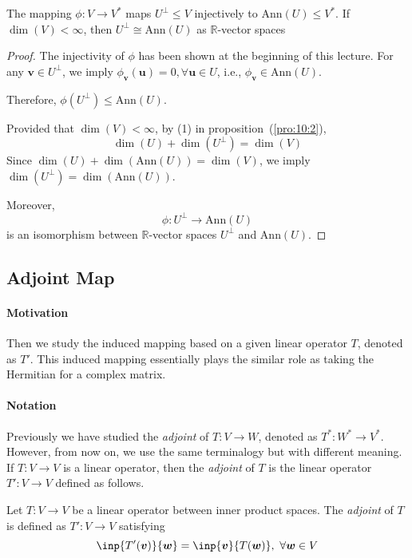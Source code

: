 \begin{proposition}
The mapping $\phi:V\to V^*$ maps $U^\perp\le V$ injectively to $\text{Ann}(U)\le V^*$.
If $\dim(V)<\infty$, then $U^\perp\cong\text{Ann}(U)$ as $\mathbb{R}$-vector spaces
\end{proposition}
\begin{proof}
The injectivity of $\phi$ has been shown at the beginning of this lecture.
For any $\bm v\in U^\perp$, we imply $\phi_{\bm v}(\bm u)=0,\forall\bm u\in U$, i.e., $\phi_{\bm v}\in\text{Ann}(U)$.

Therefore, $\phi(U^\perp)\le\text{Ann}(U)$. 

Provided that $\dim(V)<\infty$, by (1) in proposition~(\ref{pro:10:2}), 
\[
\dim(U)+\dim(U^\perp)=\dim(V)
\]
Since $\dim(U)+\dim(\text{Ann}(U))=\dim(V)$, we imply $\dim(U^\perp) = \dim(\text{Ann}(U))$.

Moreover, 
\[
\phi:U^\perp\to\text{Ann}(U)
\]
is an isomorphism between $\mathbb{R}$-vector spaces $U^\perp$ and $\text{Ann}(U)$.
\end{proof}

\subsection{Adjoint Map}
\paragraph{Motivation}
Then we study the induced mapping based on a given linear operator $T$, denoted as $T'$.
This induced mapping essentially plays the similar role as taking the Hermitian for a complex matrix.
\paragraph{Notation}
Previously we have studied the \emph{adjoint} of $T:V\to W$, denoted as $T^*:W^*\to V^*$.
However, from now on, we use the same terminalogy but with different meaning.
If $T:V\to V$ is a linear operator, then the \emph{adjoint} of $T$ is the linear operator $T':V\to V$ defined as follows.

\begin{definition}[Adjoint]
Let $T:V\to V$ be a linear operator between inner product spaces.
The \emph{adjoint} of $T$ is defined as 
$T':V\to V$ satisfying
\begin{equation}\label{Eq:10:1}
\inp{T'(\bm v)}{\bm w}=\inp{\bm v}{T(\bm w)},\ \forall \bm w\in V
\end{equation}
\end{definition}


